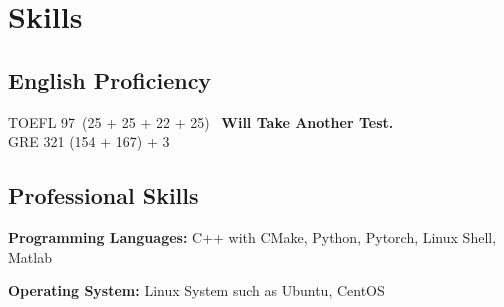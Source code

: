 \documentclass[a4paper]{article}
\begin{document}
\section{Skills}
\vspace{-0.5em}
\subsection{English Proficiency}
\vspace{-0.5em}
TOEFL 97\ (25 + 25 + 22 + 25) \ \textbf{Will Take Another Test.}\\
GRE 321 (154 + 167) + 3
\subsection{Professional Skills}
\vspace{-0.5em}
\textbf{Programming Languages:} C++ with CMake, Python, Pytorch, Linux Shell, Matlab
\par
\textbf{Operating System:} Linux System such as Ubuntu, CentOS
\end{document}
